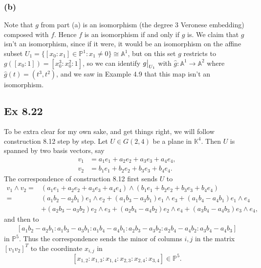 \documentclass{article}
\newcommand\restr[2]{{%
  \left.\kern-\nulldelimiterspace %
  #1 %
  \vphantom{\big|} %
  \right|_{#2} %
  }}
\theoremstyle{definition}
\newcommand{\K}{\mathbb{K}}
\renewcommand{\P}{\mathbb{P}}
\newcommand{\A}{\mathbb{A}}
\renewcommand{\AA}[1]{\A^{#1}}
\newcommand{\PP}[1]{\P^{#1}}
\begin{document}
\subsubsection*{(b)}

Note that $g$ from part (a) is an isomorphism (the degree $3$ Veronese
embedding) composed with $f$. Hence $f$ is an isomorphism if and only if $g$
is. We claim that $g$ isn't an isomorphism, since if it were, it would be an
isomorphism on the affine subset $U_1 = \{ [x_0 : x_1] \in \PP{1} : x_1 \not =
0 \} \cong \AA{1}$, but on this set $g$ restricts to $g([x_0 : 1]) = [x_0^{3} :
x_0^{2} : 1]$, so we can identify $\restr{g}{U_1}$ with $\hat{g} : \AA{1} \to
\AA{2}$ where $\hat{g}(t) = (t^{3}, t^{2})$, and we saw in Example 4.9 that
this map isn't an isomorphism.



\subsection*{Ex 8.22}

To be extra clear for my own sake, and get things right, we will follow 
construction 8.12 step by step. Let $U \in G(2, 4)$ be a plane in 
$\K^4$. Then $U$ is spanned by two basis vectors, say 
\begin{align}
	v_1 &= a_1 e_1 + a_2 e_2 + a_3 e_3 + a_4 e_4, \\
	v_2 &= b_1 e_1 + b_2 e_2 + b_3 e_3 + b_4 e_4.
\end{align}
The correspondence of construction 8.12 first sends $U$ to 
\begin{align*}
	v_1 \wedge v_2
	=&
	(a_1 e_1 + a_2 e_2 + a_3 e_3 + a_4 e_4)
	\wedge
	(b_1 e_1 + b_2 e_2 + b_3 e_3 + b_4 e_4) \\
	=&
	(a_1 b_2 - a_2 b_1) e_1 \wedge e_2
	+
	(a_1 b_3 - a_3 b_1) e_1 \wedge e_3
	+
	(a_1 b_4 - a_4 b_1) e_1 \wedge e_4 \\
	 &+
	(a_2 b_3 - a_3 b_2) e_2 \wedge e_3
	+
	(a_2 b_4 - a_4 b_2) e_2 \wedge e_4
	+
	(a_3 b_4 - a_4 b_3) e_3 \wedge e_4,
\end{align*}
and then to 
\begin{align*}
	\left[
	a_1 b_2 - a_2 b_1
	:
	a_1 b_3 - a_3 b_1
	:
	a_1 b_4 - a_4 b_1
	:
	a_2 b_3 - a_3 b_2
	:
	a_2 b_4 - a_4 b_2
	:
	a_3 b_4 - a_4 b_3
	\right]
\end{align*}
in $\PP{5}$. Thus the correspondence sends the minor of columns $i, j$ in the
matrix $[v_1 v_2]^T$ to the coordinate $x_{i, j}$ in
\[
	[x_{1, 2} : x_{1, 3} : x_{1, 4} : x_{2, 3} : x_{2, 4} : x_{3, 4}] \in \PP{5}.
\]
\end{document}
